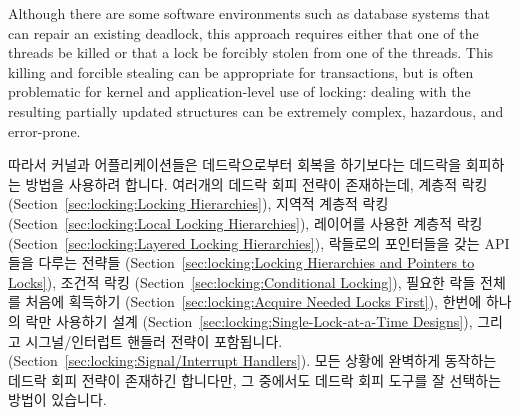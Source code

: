 Although there are some software environments such as database systems
that can repair an existing deadlock, this approach requires either that
one of the threads be killed or that a lock be forcibly stolen from one
of the threads.
This killing and forcible stealing can be appropriate for transactions,
but is often problematic for kernel and application-level use of locking:
dealing with the resulting partially updated structures can be extremely
complex, hazardous, and error-prone.
\fi

따라서 커널과 어플리케이션들은 데드락으로부터 회복을 하기보다는 데드락을
회피하는 방법을 사용하려 합니다.
여러개의 데드락 회피 전략이 존재하는데, 계층적 락킹
(Section~\ref{sec:locking:Locking Hierarchies}),
지역적 계층적 락킹
(Section~\ref{sec:locking:Local Locking Hierarchies}),
레이어를 사용한 계층적 락킹
(Section~\ref{sec:locking:Layered Locking Hierarchies}),
락들로의 포인터들을 갖는 API 들을 다루는 전략들
(Section~\ref{sec:locking:Locking Hierarchies and Pointers to Locks}),
조건적 락킹
(Section~\ref{sec:locking:Conditional Locking}),
필요한 락들 전체를 처음에 획득하기
(Section~\ref{sec:locking:Acquire Needed Locks First}),
한번에 하나의 락만 사용하기 설계
(Section~\ref{sec:locking:Single-Lock-at-a-Time Designs}),
그리고 시그널/인터럽트 핸들러 전략이 포함됩니다.
(Section~\ref{sec:locking:Signal/Interrupt Handlers}).
모든 상황에 완벽하게 동작하는 데드락 회피 전략이 존재하긴 합니다만, 그 중에서도
데드락 회피 도구를 잘 선택하는 방법이 있습니다.

